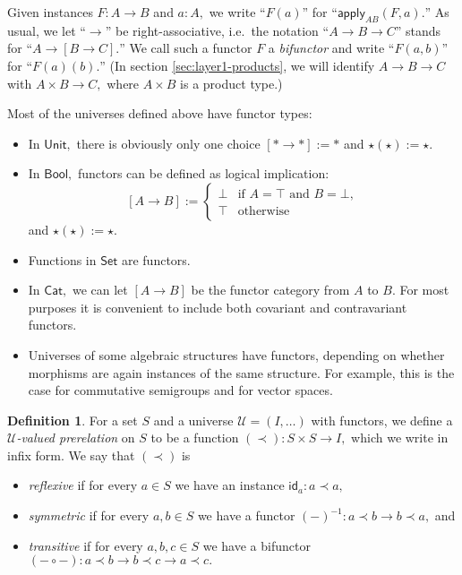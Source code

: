 \documentclass[a4paper]{article}
\theoremstyle{definition}
\newtheorem{definition}{Definition}[section]
\theoremstyle{remark}
\newcommand{\defn}{\emph}
\newcommand{\U}{\mathcal{U}}
\newcommand{\nm}{\mathsf}
\newcommand{\universe}{\nm}
\newcommand{\Unit}{\universe{Unit}}
\newcommand{\Bool}{\universe{Bool}}
\newcommand{\Set}{\universe{Set}}
\newcommand{\Cat}{\universe{Cat}}
\newcommand{\id}{\nm{id}}
\newcommand{\apply}{\nm{apply}}
\begin{document}
Given instances $F : A \to B$ and $a : A,$ we write ``$F(a)$'' for ``$\apply_{AB}(F,a).$''
As usual, we let ``$\to$'' be right-associative, i.e.\ the notation ``$A \to B \to C$'' stands for
``$A \to [B \to C].$'' We call such a functor $F$ a \defn{bifunctor} and write ``$F(a,b)$'' for
``$F(a)(b).$'' (In section \ref{sec:layer1-products}, we will identify $A \to B \to C$ with
$A \times B \to C,$ where $A \times B$ is a product type.)

Most of the universes defined above have functor types:
\begin{itemize}
  \item In $\Unit,$ there is obviously only one choice $[\ast \to \ast] := \ast$ and
  $\star(\star) := \star.$
  \item In $\Bool,$ functors can be defined as logical implication:
  \[[A \to B] := \begin{cases}
    \bot & \text{if } A = \top \text{ and } B = \bot,\\
    \top & \text{otherwise}
  \end{cases}\]
  and $\star(\star) := \star.$
  \item Functions in $\Set$ are functors.
  \item In $\Cat,$ we can let $[A \to B]$ be the functor category from $A$ to $B.$ For most purposes
  it is convenient to include both covariant and contravariant functors.
  \item Universes of some algebraic structures have functors, depending on whether morphisms are
  again instances of the same structure. For example, this is the case for commutative semigroups
  and for vector spaces.
\end{itemize}

\begin{definition}
  For a set $S$ and a universe $\U = (I,\dots)$ with functors, we define a
  \defn{$\U$-valued prerelation} on $S$ to be a function $(\prec) : S \times S \to I,$ which we
  write in infix form.
  We say that $(\prec)$ is
  \begin{itemize}
    \item \defn{reflexive} if for every $a \in S$ we have an instance $\id_a : a \prec a,$
    \item \defn{symmetric} if for every $a,b \in S$ we have a functor
    $(-)^{-1} : a \prec b \to b \prec a,$ and
    \item \defn{transitive} if for every $a,b,c \in S$ we have a bifunctor
    $(- \circ -) : a \prec b \to b \prec c \to a \prec c.$
  \end{itemize}
\end{definition}
\end{document}
